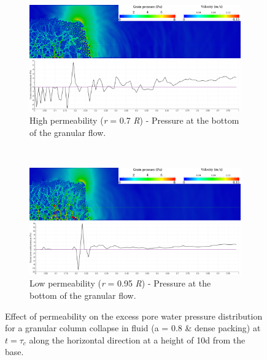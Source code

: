 \documentclass[12pt,a4paper,twocolumn,fleqn]{narms}
\begin{document}
\begin{figure}
\centering
\begin{subfigure}[t]{0.975\linewidth}
	\centering
    \includegraphics[width=\linewidth]{figs/a08/r07_PWP_ini_dense}
    \caption{High permeability (\textit{r} = 0.7 \textit{R}) - Pressure at the 
        bottom of the granular flow.}
    \label{fig:r07_PWP_ini_dense}
\end{subfigure} \\
\begin{subfigure}[t]{0.975\linewidth}
	\centering
    \includegraphics[width=\linewidth]{figs/a08/r095_PWP_ini_dense}
    \caption{Low permeability (\textit{r} = 0.95 \textit{R}) - Pressure at the 
        bottom of the granular flow.}
    \label{fig:r095_PWP_ini_dense}
\end{subfigure}
\caption{Effect of permeability on the excess pore water pressure distribution 
for a granular column collapse in fluid (a = 0.8 \& dense packing) at $t = 
\tau_c$ along the horizontal direction at a height of 10d from the base.}
\label{fig:PWP_ini_dense}
\end{figure}
\end{document}
